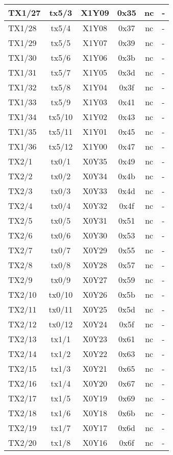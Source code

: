 \begin{longtable}{|l|c|c|c|c|l|}
TX1/27 & tx5/3  & X1Y09 & 0x35 & nc & -\\\hline
TX1/28 & tx5/4  & X1Y08 & 0x37 & nc & -\\\hline
TX1/29 & tx5/5  & X1Y07 & 0x39 & nc & -\\\hline
TX1/30 & tx5/6  & X1Y06 & 0x3b & nc & -\\\hline
TX1/31 & tx5/7  & X1Y05 & 0x3d & nc & -\\\hline
TX1/32 & tx5/8  & X1Y04 & 0x3f & nc & -\\\hline
TX1/33 & tx5/9  & X1Y03 & 0x41 & nc & -\\\hline
TX1/34 & tx5/10 & X1Y02 & 0x43 & nc & -\\\hline
TX1/35 & tx5/11 & X1Y01 & 0x45 & nc & -\\\hline
TX1/36 & tx5/12 & X1Y00 & 0x47 & nc & -\\\hline
TX2/1  & tx0/1  & X0Y35 & 0x49 & nc & -\\\hline
TX2/2  & tx0/2  & X0Y34 & 0x4b & nc & -\\\hline
TX2/3  & tx0/3  & X0Y33 & 0x4d & nc & -\\\hline
TX2/4  & tx0/4  & X0Y32 & 0x4f & nc & -\\\hline
TX2/5  & tx0/5  & X0Y31 & 0x51 & nc & -\\\hline
TX2/6  & tx0/6  & X0Y30 & 0x53 & nc & -\\\hline
TX2/7  & tx0/7  & X0Y29 & 0x55 & nc & -\\\hline
TX2/8  & tx0/8  & X0Y28 & 0x57 & nc & -\\\hline
TX2/9  & tx0/9  & X0Y27 & 0x59 & nc & -\\\hline
TX2/10 & tx0/10 & X0Y26 & 0x5b & nc & -\\\hline
TX2/11 & tx0/11 & X0Y25 & 0x5d & nc & -\\\hline
TX2/12 & tx0/12 & X0Y24 & 0x5f & nc & -\\\hline
TX2/13 & tx1/1  & X0Y23 & 0x61 & nc & -\\\hline
TX2/14 & tx1/2  & X0Y22 & 0x63 & nc & -\\\hline
TX2/15 & tx1/3  & X0Y21 & 0x65 & nc & -\\\hline
TX2/16 & tx1/4  & X0Y20 & 0x67 & nc & -\\\hline
TX2/17 & tx1/5  & X0Y19 & 0x69 & nc & -\\\hline
TX2/18 & tx1/6  & X0Y18 & 0x6b & nc & -\\\hline
TX2/19 & tx1/7  & X0Y17 & 0x6d & nc & -\\\hline
TX2/20 & tx1/8  & X0Y16 & 0x6f & nc & -\\\hline

\end{longtable}
